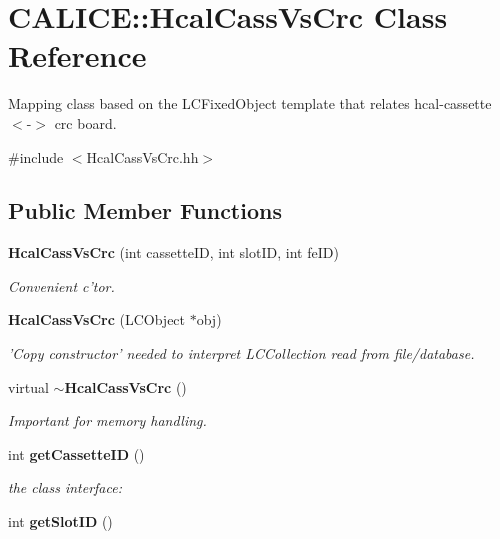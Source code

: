 \section{CALICE::HcalCassVsCrc Class Reference}
\label{classCALICE_1_1HcalCassVsCrc}


Mapping class based on the LCFixedObject template that relates hcal-\/cassette $<$-\/$>$ crc board.  


{\ttfamily \#include $<$HcalCassVsCrc.hh$>$}\subsection*{Public Member Functions}
\begin{DoxyCompactItemize}
\item 
{\bf HcalCassVsCrc} (int cassetteID, int slotID, int feID)\label{classCALICE_1_1HcalCassVsCrc_acac3879060b6b68debe0a745edd6aee4}

\begin{DoxyCompactList}\small\item\em Convenient c'tor. \item\end{DoxyCompactList}\item 
{\bf HcalCassVsCrc} (LCObject $\ast$obj)\label{classCALICE_1_1HcalCassVsCrc_a8a358967f908bb95a3d91b1d146c29d5}

\begin{DoxyCompactList}\small\item\em 'Copy constructor' needed to interpret LCCollection read from file/database. \item\end{DoxyCompactList}\item 
virtual {\bf $\sim$HcalCassVsCrc} ()\label{classCALICE_1_1HcalCassVsCrc_a8a97f7c3778a20a0c5b07d7698ac1b98}

\begin{DoxyCompactList}\small\item\em Important for memory handling. \item\end{DoxyCompactList}\item 
int {\bf getCassetteID} ()\label{classCALICE_1_1HcalCassVsCrc_ad4aefc286108f1142bec4cf745a40688}

\begin{DoxyCompactList}\small\item\em the class interface: \item\end{DoxyCompactList}\item 
int {\bfseries getSlotID} ()\label{classCALICE_1_1HcalCassVsCrc_a369e980573265ca9b9db146b9e218ba3}


\end{DoxyCompactItemize}
